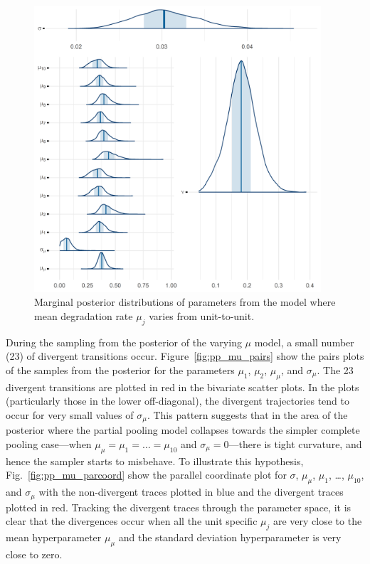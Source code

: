 \begin{figure}
   \centering
   \includegraphics[width=0.95\textwidth]{./figures/ch-5/plot-pp-mu-marg-post-1.png}
   \caption{Marginal posterior distributions of parameters from the model where mean degradation rate $\mu_j$ varies from unit-to-unit.}
   \label{fig:pp_mu_marg} 
\end{figure}

During the sampling from the posterior of the varying $\mu$ model, a small number (23) of divergent transitions occur. Figure~\ref{fig:pp_mu_pairs} show the pairs plots of the samples from the posterior for the parameters $\mu_1$, $\mu_2$, $\mu_\mu$, and $\sigma_\mu$. The 23 divergent transitions are plotted in red in the bivariate scatter plots. In the plots (particularly those in the lower off-diagonal), the divergent trajectories tend to occur for very small values of $\sigma_\mu$. This pattern suggests that in the area of the posterior where the partial pooling model collapses towards the simpler complete pooling case---when $\mu_\mu = \mu_1 = \ldots = \mu_{10}$ and $\sigma_\mu = 0$---there is tight curvature, and hence the sampler starts to misbehave. To illustrate this hypothesis, Fig.~\ref{fig:pp_mu_parcoord} show the parallel coordinate plot for $\sigma$, $\mu_\mu$, $\mu_1$, \ldots, $\mu_{10}$, and $\sigma_\mu$ with the non-divergent traces plotted in blue and the divergent traces plotted in red. Tracking the divergent traces through the parameter space, it is clear that the divergences occur when all the unit specific $\mu_j$ are very close to the mean hyperparameter $\mu_\mu$ and the standard deviation hyperparameter is very close to zero.

